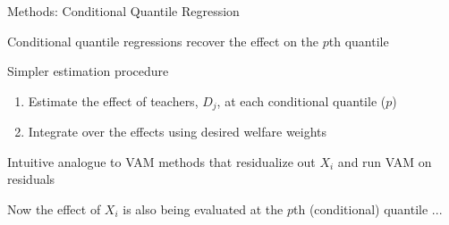 \documentclass[t,aspectratio=169,11pt]{beamer}
\newenvironment{wideitemize}{\itemize\addtolength{\itemsep}{14pt}}{\enditemize}
\begin{document}
\begin{frame}{Methods: Conditional Quantile Regression}

\begin{wideitemize}

    \item Conditional quantile regressions recover the effect on the $p$th quantile
    
    \item Simpler estimation procedure
    \begin{enumerate}
        \item Estimate the effect of teachers, $D_j$, at each conditional quantile ($p$)
        \item Integrate over the effects using desired welfare weights
    \end{enumerate}

    \item Intuitive analogue to VAM methods that residualize out $X_i$ and run VAM on residuals
    
    \item Now the effect of $X_i$ is also being evaluated at the $p$th (conditional) quantile ...
    

\end{wideitemize}
\end{frame}

\end{document}
